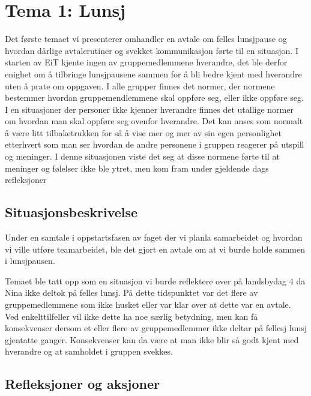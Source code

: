 \chapter{Tema 1: Lunsj}


Det første temaet vi presenterer omhandler en avtale om felles lunsjpause og hvordan dårlige avtalerutiner og svekket kommunikasjon førte til en situasjon. I starten av EiT kjente ingen av gruppemedlemmene hverandre, det ble derfor enighet om å tilbringe lunsjpausene sammen for å bli bedre kjent med hverandre uten å prate om oppgaven. I alle grupper finnes det normer, der normene bestemmer hvordan gruppemendlemmene skal oppføre seg, eller ikke oppføre seg. \cite{Artikkel2} I en situasjoner der personer ikke kjenner hverandre finnes det utallige normer om hvordan man skal oppføre seg ovenfor hverandre. Det kan anses som normalt å være litt tilbaketrukken for så å vise mer og mer av sin egen personlighet etterhvert som man ser hvordan de andre personene i gruppen reagerer på utspill og meninger. I denne situasjonen viste det seg at disse normene førte til at meninger og følelser ikke ble ytret, men kom fram under gjeldende dags refleksjoner

\section{Situasjonsbeskrivelse}

Under en samtale i oppstartsfasen av faget der vi planla samarbeidet og hvordan vi ville utføre teamarbeidet, ble det gjort en avtale om at vi burde holde sammen i lunsjpausen.


Temaet ble tatt opp som en situasjon vi burde reflektere over på landsbydag 4 da Nina ikke deltok på felles lunsj. På dette tidspunktet var det flere av gruppemedlemmene som ikke husket eller var klar over at dette var en avtale. Ved enkelttilfeller vil ikke dette ha noe særlig betydning, men kan få konsekvenser dersom et eller flere av gruppemedlemmer ikke deltar på fellesj lunsj gjentatte ganger. Konsekvenser kan da være at man ikke blir så godt kjent med hverandre og at samholdet i gruppen svekkes. 

\section{Refleksjoner og aksjoner}

